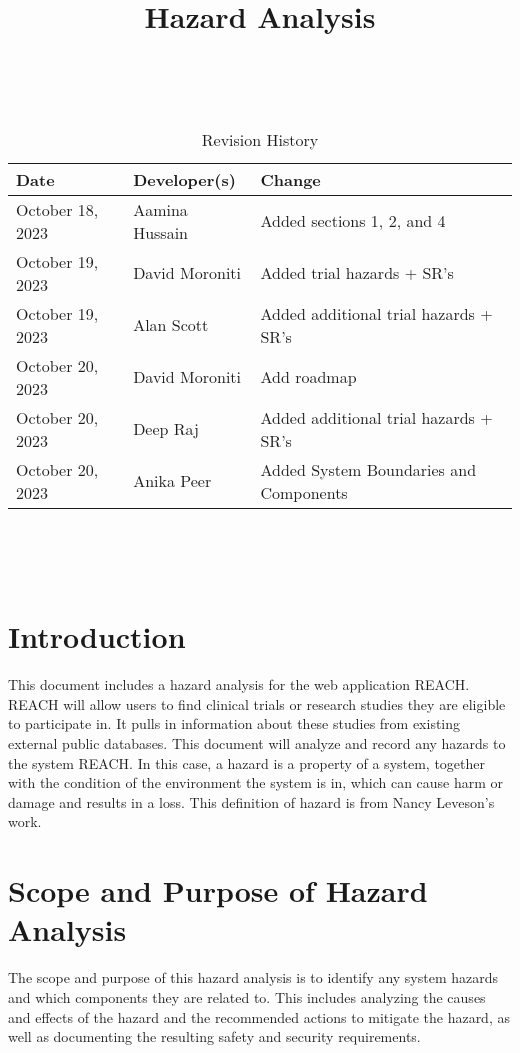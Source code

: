 \documentclass{article}
\title{Hazard Analysis\\\progname}
\author{\authname}
\date{}
\begin{document}
\maketitle
\thispagestyle{empty}

~\newpage


\begin{table}[hp]
\caption{Revision History} \label{TblRevisionHistory}
\begin{tabularx}{\textwidth}{llX}
\toprule
\textbf{Date} & \textbf{Developer(s)} & \textbf{Change}\\
\midrule
October 18, 2023 & Aamina Hussain & Added sections 1, 2, and 4\\
October 19, 2023 & David Moroniti & Added trial hazards + SR's\\
October 19, 2023 & Alan Scott & Added additional trial hazards + SR's \\
October 20, 2023 & David Moroniti & Add roadmap\\
October 20, 2023 & Deep Raj & Added additional trial hazards + SR's \\
October 20, 2023 & Anika Peer & Added System Boundaries and Components \\
\bottomrule
\end{tabularx}
\end{table}

~\newpage

\tableofcontents

~\newpage


\section{Introduction}
This document includes a hazard analysis for the web application REACH. REACH will allow users 
to find clinical trials or research studies they are eligible to participate in. It pulls in information about these studies 
from existing external public databases. This document will analyze and record any hazards to the system REACH. In this case, 
a hazard is a property of a system, together with the condition of the environment the system is in, which can cause harm or 
damage and results in a loss. This definition of hazard is from Nancy Leveson's work.

\section{Scope and Purpose of Hazard Analysis}
The scope and purpose of this hazard analysis is to identify any system hazards and which components they are related to. This 
includes analyzing the causes and effects of the hazard and the recommended actions to mitigate the hazard, as well as documenting 
the resulting safety and security requirements.
\end{document}
